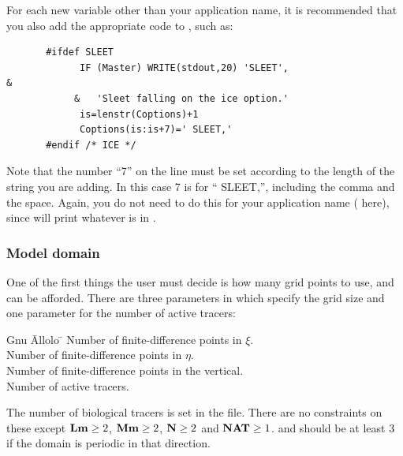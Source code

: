 For each new  variable other than your application name,
it is recommended that you also
add the appropriate code to , such as:
\begin{verbatim}
       #ifdef SLEET
             IF (Master) WRITE(stdout,20) 'SLEET',                      &
            &   'Sleet falling on the ice option.'
             is=lenstr(Coptions)+1
             Coptions(is:is+7)=' SLEET,'
       #endif /* ICE */
\end{verbatim}
Note that the number ``7'' on the  line must be set
according to the length of the string you are adding.  In this case 7
is for `` SLEET,'', including the comma and the space. Again, you do not
need to do this for your application name ( here),
since  will print whatever is in .

\subsubsection{Model domain}
\label{Muddy}
One of the first things the user must decide is how many grid points
to use, and can be afforded.  There are three parameters in
 which specify the grid size and one parameter for the
number of active tracers:
\begin{tabbing}
  Gnu \= Allolo \= \kill
  \>  \> Number of finite-difference points in $\xi$. \\
  \>  \> Number of finite-difference points in $\eta$. \\
  \>  \> Number of finite-difference points in the vertical. \\
  \>  \> Number of active tracers. \\
\end{tabbing}
The number of biological tracers is set in the  file.
There are no constraints on these except $\mbox{\bf Lm} \geq 2$, $\mbox{\bf Mm}
\geq 2$, $\mbox{\bf N} \geq 2$ and $\mbox{\bf NAT} \geq 1$.   and
 should be at least 3 if the domain is periodic in that
direction.

